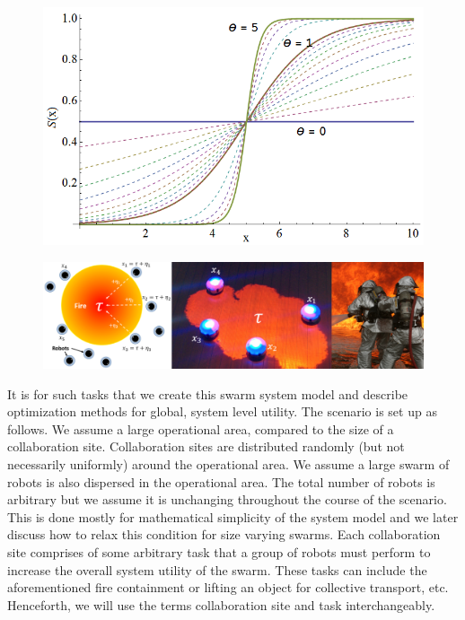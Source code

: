 \documentclass{sage}
\begin{document}
\begin{figure}[!ht]
\centering\includegraphics[width=.5\textwidth]{../figures/sigmoid1.png}
\centering\caption{}\label{fig:sigmoid}
\end{figure}



\begin{figure}[!ht]
\centering\includegraphics[width=\textwidth]{../figures/dropletfire.png}
\centering\caption{}\label{fig:dropletfire}
\end{figure}

It is for such tasks that we create this swarm system model and describe optimization methods for global, system level utility. The scenario is set up as follows. We assume a large operational area, compared to the size of a collaboration site. Collaboration sites are distributed randomly (but not necessarily uniformly) around the operational area. We assume a large swarm of robots is also dispersed in the operational area. The total number of robots is arbitrary but we assume it is unchanging throughout the course of the scenario. This is done mostly for mathematical simplicity of the system model and we later discuss how to relax this condition for size varying swarms. Each collaboration site comprises of some arbitrary task that a group of robots must perform to increase the overall system utility of the swarm. These tasks can include the aforementioned fire containment or lifting an object for collective transport, etc. Henceforth, we will use the terms collaboration site and task interchangeably.
\end{document}
